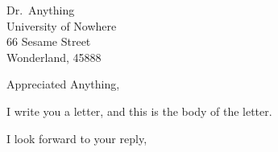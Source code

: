 \documentclass{letter}
\begin{document}
\begin{letter}
{Dr.~Anything \\ University of Nowhere\\ 66 Sesame Street\\ Wonderland, 45888}

\opening{Appreciated Anything,}

I write you a letter, and this is the body of the
letter.

\closing{I look forward to your reply,}

\end{letter}
\end{document}
